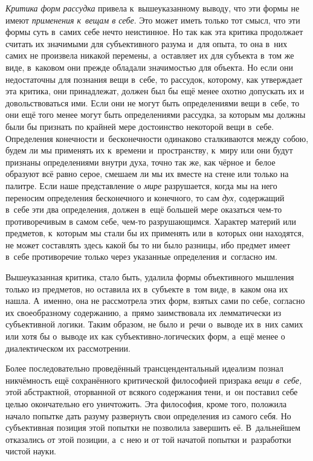 {\em Критика форм рассудка} привела к~вышеуказанному
выводу, что эти формы не имеют {\em применения к~вещам
в себе}. Это может иметь только тот смысл, что эти формы суть в~самих себе
нечто неистинное. Но так как эта критика продолжает считать их значимыми
для субъективного разума и~для опыта, то она в~них самих не произвела
никакой перемены, а~оставляет их для субъекта в~том же виде, в~каковом они
прежде обладали значимостью для объекта. Но если они недостаточны для
познания вещи в~себе, то рассудок, которому, как утверждает эта критика,
они принадлежат, должен был бы ещё менее охотно допускать их и
довольствоваться ими. Если они не могут быть определениями вещи в~себе, то
они ещё того менее могут быть определениями рассудка, за которым мы должны
были бы признать по крайней мере достоинство некоторой вещи в~себе.
Определения конечности и~бесконечности одинаково сталкиваются между собою,
будем ли мы применять их к~времени и~пространству, к~миру или они будут
признаны определениями внутри духа, точно так же, как чёрное и~белое
образуют всё равно серое, смешаем ли мы их вместе на стене или только на
палитре. Если наше представление о {\em мире}
разрушается, когда мы на него переносим определения бесконечного и
конечного, то сам {\em дух,} содержащий в~себе эти два
определения, должен в~ещё большей мере оказаться чем-то противоречивым в
самом себе, чем-то разрушающимся. Характер материй или предметов, к~которым
мы стали бы их применять или в~которых они находятся, не может составлять
здесь какой бы то ни было разницы, ибо предмет имеет в~себе противоречие
только через указанные определения и~согласно им.

Вышеуказанная критика, стало быть, удалила формы объективного мышления
только из предметов, но оставила их в~субъекте в~том виде, в~каком она их
нашла. А~именно, она не рассмотрела этих форм, взятых сами по себе,
согласно их своеобразному содержанию, а~прямо заимствовала их лемматически
из субъективной логики. Таким образом, не было и~речи о~выводе их в~них
самих или хотя бы о~выводе их как субъективно-логических форм, а~ещё менее
о диалектическом их рассмотрении.

Более последовательно проведённый трансцендентальный идеализм познал
никчёмность ещё сохранённого критической философией призрака
{\em вещи в~себе,} этой абстрактной, оторванной от
всякого содержания тени, и~он поставил себе целью окончательно его
уничтожить.
Эта философия, кроме того, положила начало попытке дать разуму развернуть
свои определения из самого себя. Но субъективная позиция этой попытки не
позволила завершить её. В~дальнейшем отказались от этой позиции, а~с нею и
от той начатой попытки и~разработки чистой науки.

